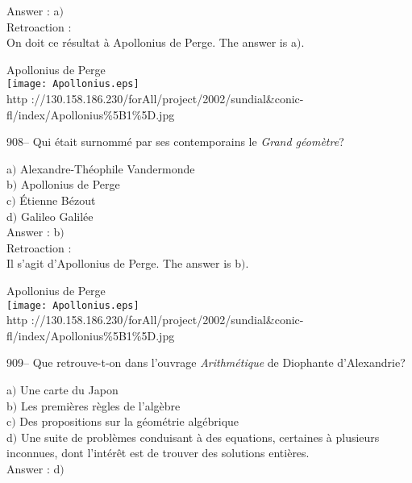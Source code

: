 ﻿\documentclass[letterpaper, 12pt]{article}
\begin{document}
Answer : a$)$\\

Retroaction : \\
On doit ce r\'esultat \`a Apollonius de Perge. The answer is a$)$.\\

        \begin{center}
        Apollonius de Perge\\
    \texttt{[image: Apollonius.eps]}\\
        {\footnotesize http
://130.158.186.230/forAll/project/2002/sundial\&conic-fl/index/Apollonius\%5B1\%5D.jpg}
    \end{center}

908-- Qui \'etait surnomm\'e par ses contemporains le {\sl Grand
g\'eom\`etre}?

a$)$ Alexandre-Th\'eophile Vandermonde \\
b$)$ Apollonius de Perge \\
c$)$ \'Etienne B\'ezout \\
d$)$ Galileo Galil\'ee \\

Answer : b$)$\\

Retroaction : \\
Il s'agit d'Apollonius de Perge. The answer is b$)$.\\

        \begin{center}
        Apollonius de Perge\\
    \texttt{[image: Apollonius.eps]}\\
        {\footnotesize http
://130.158.186.230/forAll/project/2002/sundial\&conic-fl/index/Apollonius\%5B1\%5D.jpg}
    \end{center}

909-- Que retrouve-t-on dans l'ouvrage {\sl Arithm\'etique} de
Diophante d'Alexandrie?

a$)$ Une carte du Japon \\
b$)$ Les premi\`eres r\`egles de l'alg\`ebre \\
c$)$ Des propositions sur la g\'eom\'etrie alg\'ebrique \\
d$)$ Une suite de probl\`emes conduisant \`a des equations, certaines \`a
plusieurs inconnues,
dont l'int\'er\^et est de trouver des solutions enti\`eres.\\

Answer : d$)$\\
\end{document}
